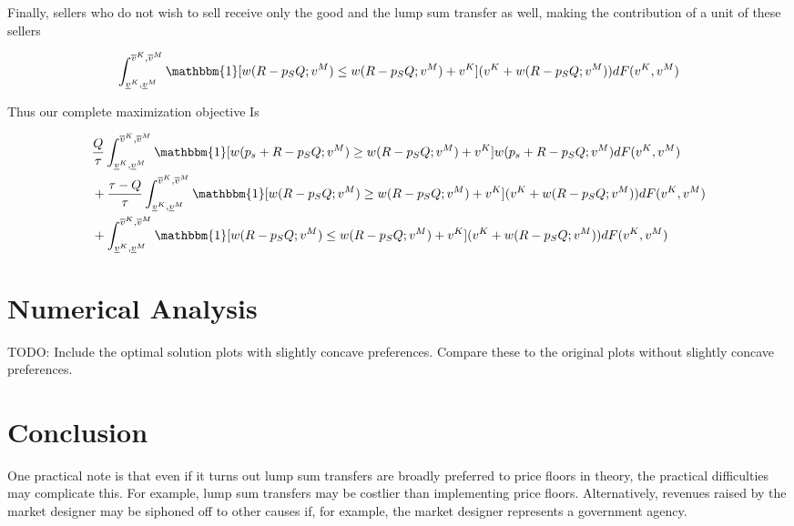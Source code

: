 \documentclass[AER]{AEA}
\begin{document}
Finally, sellers who do not wish to sell receive only the good and the lump sum transfer as well, making the contribution of a unit of these sellers

\begin{equation}
    \int_{\underline{v}^K, \underline{v}^M}^{\overline{v}^K, \overline{v}^M} \mathbbm{1}[w(R - p_SQ; v^M) \le w(R - p_S Q ; v^M) + v^K] (v^K + w(R - p_SQ; v^M)) dF(v^K, v^M)
\end{equation}

Thus our complete maximization objective Is

\begin{equation}
    \begin{split}
        & \frac{Q}{\tau} \int_{\underline{v}^K, \underline{v}^M}^{\overline{v}^K, \overline{v}^M} \mathbbm{1}[w(p_s + R - p_SQ; v^M) \ge w(R - p_S Q ; v^M) + v^K] w(p_s + R - p_SQ; v^M) dF(v^K, v^M) \\
        & + \frac{\tau - Q}{\tau} \int_{\underline{v}^K, \underline{v}^M}^{\overline{v}^K, \overline{v}^M} \mathbbm{1}[w(R - p_SQ; v^M) \ge w(R - p_S Q ; v^M) + v^K] (v^K + w(R - p_SQ; v^M)) dF(v^K, v^M) \\
        & + \int_{\underline{v}^K, \underline{v}^M}^{\overline{v}^K, \overline{v}^M} \mathbbm{1}[w(R - p_SQ; v^M) \le w(R - p_S Q ; v^M) + v^K] (v^K + w(R - p_SQ; v^M)) dF(v^K, v^M)
    \end{split}
\end{equation}

\section{Numerical Analysis}

TODO: Include the optimal solution plots with slightly concave preferences. Compare these to the original plots without slightly concave preferences.


\section{Conclusion}

One practical note is that even if it turns out lump sum transfers are broadly preferred to price floors in theory, the practical difficulties may complicate this. For example, lump sum transfers may be costlier than implementing price floors. Alternatively, revenues raised by the market designer may be siphoned off to other causes if, for example, the market designer represents a government agency.
\end{document}
